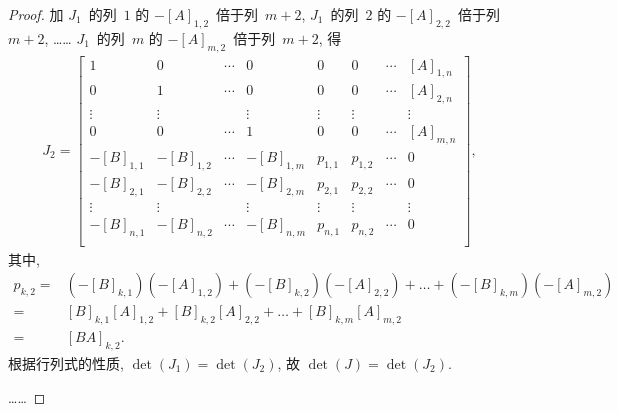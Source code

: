 \documentclass[../libro.tex]{subfiles}
\begin{document}
\begin{proof}
    加
    \(J_1\)~的列~\(1\) 的 \(-[A]_{1,2}\)~倍于列~\(m+2\),
    \(J_1\)~的列~\(2\) 的 \(-[A]_{2,2}\)~倍于列~\(m+2\),
    ……
    \(J_1\)~的列~\(m\) 的 \(-[A]_{m,2}\)~倍于列~\(m+2\),
    得
    \begin{align*}
        J_2 =
        \begin{bmatrix}
            1          & 0          & \cdots & 0          &
            0          & 0          & \cdots & [A]_{1,n}    \\
            0          & 1          & \cdots & 0          &
            0          & 0          & \cdots & [A]_{2,n}    \\
            \vdots     & \vdots     & {}     & \vdots     &
            \vdots     & \vdots     & {}     & \vdots       \\
            0          & 0          & \cdots & 1          &
            0          & 0          & \cdots & [A]_{m,n}    \\
            -[B]_{1,1} & -[B]_{1,2} & \cdots & -[B]_{1,m} &
            p_{1,1}    & p_{1,2}    & \cdots & 0            \\
            -[B]_{2,1} & -[B]_{2,2} & \cdots & -[B]_{2,m} &
            p_{2,1}    & p_{2,2}    & \cdots & 0            \\
            \vdots     & \vdots     & {}     & \vdots     &
            \vdots     & \vdots     & {}     & \vdots       \\
            -[B]_{n,1} & -[B]_{n,2} & \cdots & -[B]_{n,m} &
            p_{n,1}    & p_{n,2}    & \cdots & 0            \\
        \end{bmatrix},
    \end{align*}
    其中,
    \begin{align*}
        p_{k,2}
        = {} &
        (-[B]_{k,1})(-[A]_{1,2})
        + (-[B]_{k,2})(-[A]_{2,2})
        + \dots
        + (-[B]_{k,m})(-[A]_{m,2})
        \\
        = {} &
        [B]_{k,1} [A]_{1,2}
        + [B]_{k,2} [A]_{2,2}
        + \dots
        + [B]_{k,m} [A]_{m,2}
        \\
        = {} &
        [BA]_{k,2}.
    \end{align*}
    根据行列式的性质,
    \(\det {(J_1)} = \det {(J_2)}\),
    故
    \(\det {(J)} = \det {(J_2)}\).

    ……


\end{proof}
\end{document}
